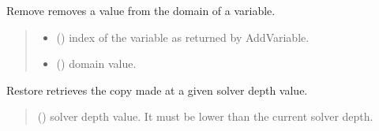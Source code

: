 \documentclass[letterpaper,10pt,openany,oneside,english]{sphinxmanual}
\begin{document}
\begin{fulllineitems}
\begin{fulllineitems}
\end{fulllineitems}


\begin{fulllineitems}
\label{\detokenize{ref/ref_python:pytoulbar2.CFN.Remove}}
\pysigstartsignatures
{}
\pysigstopsignatures
\sphinxAtStartPar
Remove removes a value from the domain of a variable.
\begin{quote}\begin{description}
\begin{itemize}
\item {} 
\sphinxAtStartPar
{} () \textendash{} index of the variable as returned by AddVariable.

\item {} 
\sphinxAtStartPar
{} () \textendash{} domain value.

\end{itemize}

\end{description}\end{quote}

\end{fulllineitems}


\begin{fulllineitems}
\label{\detokenize{ref/ref_python:pytoulbar2.CFN.Restore}}
\pysigstartsignatures
{}
\pysigstopsignatures
\sphinxAtStartPar
Restore retrieves the copy made at a given solver depth value.
\begin{quote}\begin{description}
\sphinxAtStartPar
{} () \textendash{} solver depth value. It must be lower than the current solver depth.

\end{description}\end{quote}


\end{fulllineitems}
\end{fulllineitems}
\end{document}
